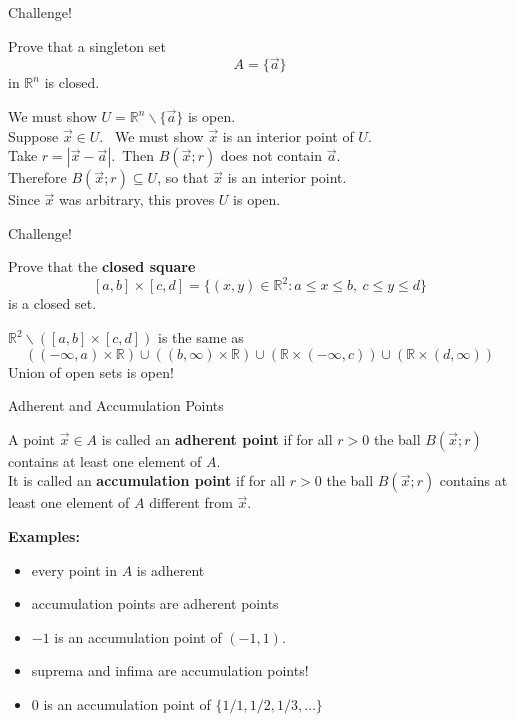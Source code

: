 \documentclass{beamer}
\begin{document}
\begin{frame}{Challenge!}
\begin{prob}
Prove that a singleton set
$$A = \{\vec a\}$$
in $\mathbb{R}^n$ is closed.
\end{prob}
\pause
\begin{soln}
We must show $U = \mathbb{R}^n\backslash\{\vec a\}$ is open.\\\pause
Suppose $\vec x\in U$.\ \pause
We must show $\vec x$ is an interior point of $U$.\\\pause
Take $r = |\vec x-\vec a|$.\ \pause Then $B(\vec x; r)$ does not contain $\vec a$.\\\pause
Therefore $B(\vec x; r)\subseteq U$, so that $\vec x$ is an interior point.\\\pause
Since $\vec x$ was arbitrary, this proves $U$ is open.
\end{soln}
\end{frame}

\begin{frame}{Challenge!}
\begin{prob}
Prove that the \textbf{closed square}
$$[a,b]\times [c,d] = \{(x,y)\in\mathbb{R}^2: a \leq x \leq b,\ c\leq y\leq d\}$$
is a closed set.
\end{prob}
\pause
\begin{soln}
$\mathbb{R}^2\backslash ([a,b]\times [c,d])$ is the same as
$$((-\infty,a)\times \mathbb{R})\cup ((b,\infty)\times \mathbb{R})\cup(\mathbb{R}\times (-\infty,c))\cup (\mathbb{R}\times (d,\infty))$$
\pause
Union of open sets is open!
\end{soln}
\end{frame}


\begin{frame}{Adherent and Accumulation Points}
\begin{defn}
A point $\vec x\in A$ is called an \textbf{adherent point} if for all $r > 0$ the ball $B(\vec x; r)$ contains at least one element of $A$.\\
\pause
It is called an \textbf{accumulation point} if for all $r > 0$ the ball $B(\vec x; r)$ contains at least one element of $A$ {\color{red} different from $\vec x$}.
\end{defn}
\pause
\textbf{Examples:}
\begin{itemize}
\pause
\item every point in $A$ is adherent
\pause
\item accumulation points are adherent points
\pause
\item $-1$ is an accumulation point of $(-1,1)$.
\pause
\item suprema and infima are accumulation points!
\pause
\item $0$ is an accumulation point of $\{1/1,1/2,1/3,\dots\}$
\end{itemize}
\end{frame}
\end{document}
